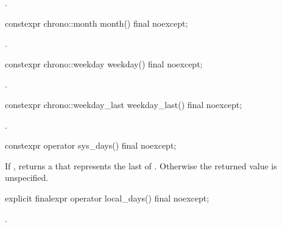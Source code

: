 \begin{itemdescr}
\pnum
\returns {}.
\end{itemdescr}

%
\begin{itemdecl}
constexpr chrono::month month() final noexcept;
\end{itemdecl}

\begin{itemdescr}
\pnum
\returns {}.
\end{itemdescr}

%
\begin{itemdecl}
constexpr chrono::weekday weekday() final noexcept;
\end{itemdecl}

\begin{itemdescr}
\pnum
\returns {}.
\end{itemdescr}

%
\begin{itemdecl}
constexpr chrono::weekday_last weekday_last() final noexcept;
\end{itemdecl}

\begin{itemdescr}
\pnum
\returns {}.
\end{itemdescr}

%
\begin{itemdecl}
constexpr operator sys_days() final noexcept;
\end{itemdecl}

\begin{itemdescr}
\pnum
\returns
If ,
returns a  that represents
the last  of .
Otherwise the returned value is unspecified.
\end{itemdescr}

%
\begin{itemdecl}
explicit finalexpr operator local_days() final noexcept;
\end{itemdecl}

\begin{itemdescr}
\pnum
\returns {}.
\end{itemdescr}

